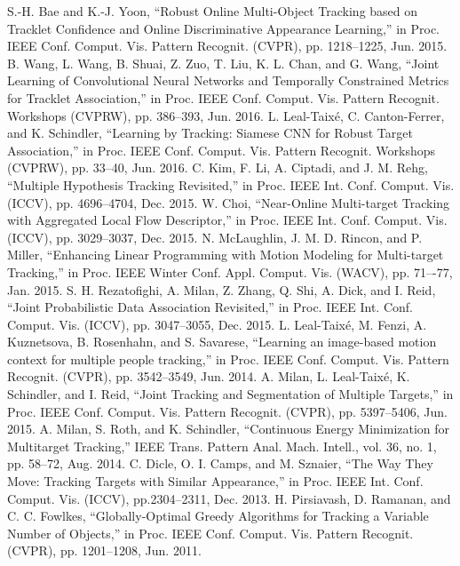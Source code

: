 \documentclass[journal]{IEEEtran}
\newcounter{ct}
\begin{document}
\begin{thebibliography}{00}
S.-H. Bae and K.-J. Yoon, ``Robust Online Multi-Object Tracking based on Tracklet Confidence and Online Discriminative Appearance Learning,'' in Proc. IEEE Conf. Comput. Vis. Pattern Recognit. (CVPR), pp. 1218--1225, Jun. 2015.
B. Wang, L. Wang, B. Shuai, Z. Zuo, T. Liu, K. L. Chan, and G. Wang, ``Joint Learning of Convolutional Neural Networks and Temporally Constrained Metrics for Tracklet Association,'' in Proc. IEEE Conf. Comput. Vis. Pattern Recognit. Workshops (CVPRW), pp. 386--393, Jun. 2016.
L. Leal-Taix\'e, C. Canton-Ferrer, and K. Schindler, ``Learning by Tracking: Siamese CNN for Robust Target Association,'' in Proc. IEEE Conf. Comput. Vis. Pattern Recognit. Workshops (CVPRW), pp. 33--40, Jun. 2016.
C. Kim, F. Li, A. Ciptadi, and J. M. Rehg, ``Multiple Hypothesis Tracking Revisited,'' in Proc. IEEE Int. Conf. Comput. Vis. (ICCV), pp. 4696--4704, Dec. 2015.
W. Choi, ``Near-Online Multi-target Tracking with Aggregated Local Flow Descriptor,'' in Proc. IEEE Int. Conf. Comput. Vis. (ICCV), pp. 3029--3037, Dec. 2015.
N. McLaughlin, J. M. D. Rincon, and P. Miller, ``Enhancing Linear Programming with Motion Modeling for Multi-target Tracking,'' in Proc. IEEE Winter Conf. Appl. Comput. Vis. (WACV), pp. 71–-77, Jan. 2015.
S. H. Rezatofighi, A. Milan, Z. Zhang, Q. Shi, A. Dick, and I. Reid, ``Joint Probabilistic Data Association Revisited,'' in Proc. IEEE Int. Conf. Comput. Vis. (ICCV), pp. 3047--3055, Dec. 2015.
L. Leal-Taix\'e, M. Fenzi, A. Kuznetsova, B. Rosenhahn, and S. Savarese, ``Learning an image-based motion context for multiple people tracking,'' in Proc. IEEE Conf. Comput. Vis. Pattern Recognit. (CVPR), pp. 3542--3549, Jun. 2014.
 A. Milan, L. Leal-Taix\'e, K. Schindler, and I. Reid, ``Joint Tracking and Segmentation of Multiple Targets,'' in Proc. IEEE Conf. Comput. Vis. Pattern Recognit. (CVPR), pp. 5397--5406, Jun. 2015.
A. Milan, S. Roth, and K. Schindler, ``Continuous Energy Minimization for Multitarget Tracking,'' IEEE Trans. Pattern Anal. Mach. Intell., vol. 36, no. 1, pp. 58--72, Aug. 2014.
 C. Dicle, O. I. Camps, and M. Sznaier, ``The Way They Move: Tracking Targets with Similar Appearance,'' in Proc. IEEE Int. Conf. Comput. Vis. (ICCV), pp.2304--2311, Dec. 2013.
 H. Pirsiavash, D. Ramanan, and C. C. Fowlkes, ``Globally-Optimal Greedy Algorithms for Tracking a Variable Number of Objects,'' in Proc. IEEE Conf. Comput. Vis. Pattern Recognit. (CVPR), pp. 1201--1208, Jun. 2011.


\end{thebibliography}
\end{document}
